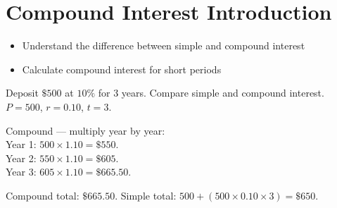 \section{Compound Interest Introduction}

\begin{stepGoal}
\begin{itemize}
    \item Understand the difference between simple and compound interest
    \item Calculate compound interest for short periods
\end{itemize}
\end{stepGoal}

\begin{stepVocabBox}
\end{stepVocabBox}

\begin{stepsCard}
\end{stepsCard}

\begin{stepExample}{Deposit $\$500$ at $10\%$ for $3$ years. Compare simple and compound interest.}
     $P = 500$, $r = 0.10$, $t = 3$.

     Compound — multiply year by year:\\
    Year 1: $500 \times 1.10 = \$550$.\\
    Year 2: $550 \times 1.10 = \$605$.\\
    Year 3: $605 \times 1.10 = \$665.50$.

     Compound total: $\$665.50$. Simple total: $500 + (500 \times 0.10 \times 3) = \$650$.
\end{stepExample}

